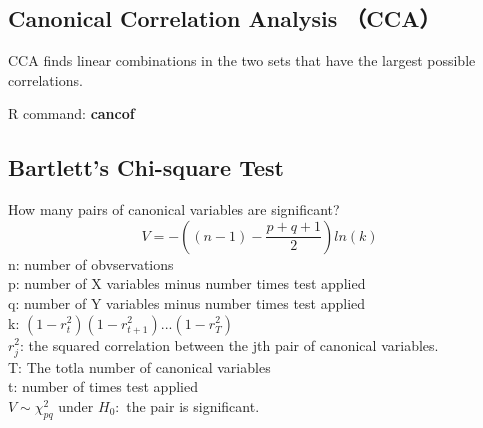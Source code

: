 \documentclass[10pt,landscape, fleqn]{article}
\begin{document}
\begin{multicols}{3}
		\section{Canonical Correlation Analysis （CCA）}
			CCA finds linear combinations in the two sets that have the largest possible correlations. \par
			R command: \textbf{cancof} 
			\subsection{Bartlett's Chi-square Test}
				How many pairs of canonical variables are significant?
				\[ V = -\left((n-1) - \frac{p+q+1}{2}\right)ln(k) \]
				n: number of obvservations \\
				p: number of X variables minus number times test applied \\
				q: number of Y variables minus number times test applied\\
				k:  $(1-r_t^2)(1-r^2_{t+1})...(1-r_T^2)$ \\
				$r_j^2$: the squared correlation between the jth pair of canonical variables. \\
				T: The totla number of canonical variables\\
				t: number of times test applied \\
				$V \sim \chi_{pq}^2$ under $H_0:$ the pair is significant.
				

\end{multicols}
\end{document}

